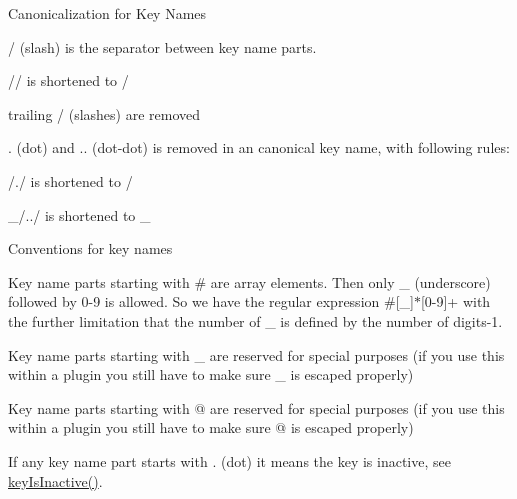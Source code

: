 \begin{DoxyParagraph}{Canonicalization for Key Names}

\begin{DoxyItemize}
\item / (slash) is the separator between key name parts.
\item // is shortened to /
\item trailing / (slashes) are removed
\item . (dot) and .. (dot-\/dot) is removed in an canonical key name, with following rules\-:
\begin{DoxyItemize}
\item /./ is shortened to /
\item \-\_\-/../ is shortened to \-\_\-
\end{DoxyItemize}
\end{DoxyItemize}
\end{DoxyParagraph}
\begin{DoxyParagraph}{Conventions for key names}

\begin{DoxyItemize}
\item Key name parts starting with \# are array elements. Then only \-\_\- (underscore) followed by 0-\/9 is allowed. So we have the regular expression \#\mbox{[}\-\_\-\mbox{]}$\ast$\mbox{[}0-\/9\mbox{]}+ with the further limitation that the number of \-\_\- is defined by the number of digits-\/1.
\item Key name parts starting with \-\_\- are reserved for special purposes (if you use this within a plugin you still have to make sure \-\_\- is escaped properly)
\item Key name parts starting with @ are reserved for special purposes (if you use this within a plugin you still have to make sure @ is escaped properly)
\item If any key name part starts with . (dot) it means the key is inactive, see \hyperlink{group__keytest_gaa25f699f592031c1a0abc1504d14e13e}{key\-Is\-Inactive()}.
\end{DoxyItemize}
\end{DoxyParagraph}
